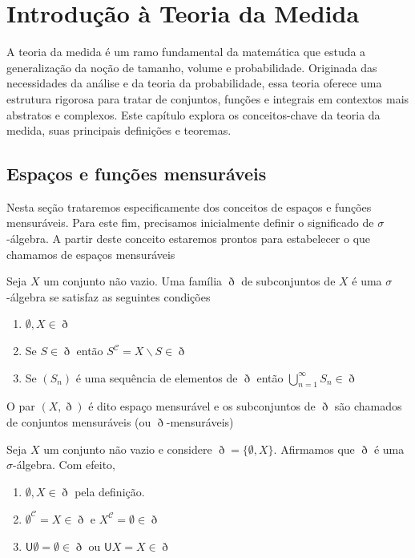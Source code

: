 \documentclass[a4paper, 11pt]{book}
\theoremstyle{definition}
\newcommand{\medcup}{\mathsf{U}}
\begin{document}
\tableofcontents

\chapter{Introdução à Teoria da Medida}

A teoria da medida é um ramo fundamental da matemática que estuda a generalização da noção de tamanho, volume e probabilidade. Originada das necessidades da análise e da teoria da probabilidade, essa teoria oferece uma estrutura rigorosa para tratar de conjuntos, funções e integrais em contextos mais abstratos e complexos. Este capítulo explora os conceitos-chave da teoria da medida, suas principais definições e teoremas.

\section{Espaços e funções mensuráveis}

Nesta seção trataremos especificamente dos conceitos de espaços e funções mensuráveis. Para este fim, precisamos inicialmente definir o significado de $\sigma$-álgebra. A partir deste conceito estaremos prontos para estabelecer o que chamamos de espaços mensuráveis

\begin{dbox}
    Seja $X$ um conjunto não vazio. Uma família $\eth$ de subconjuntos de $X$ é uma $\sigma$-álgebra se satisfaz as seguintes condições
    \begin{enumerate}[leftmargin=*]
        \item $\emptyset, X \in \eth$
        \item Se $S \in \eth$ então $S^{\mathcal{C}} = X \smallsetminus S \in \eth$
        \item Se $(S_n)$ é uma sequência de elementos de $\eth$ então $\bigcup \limits_{n=1}^{\infty} S_n \in \eth$
    \end{enumerate} 
    O par $(X, \eth)$ é dito espaço mensurável e os subconjuntos de $\eth$ são chamados de conjuntos mensuráveis (ou $\eth$-mensuráveis)
\end{dbox}

\begin{ex}
    Seja $X$ um conjunto não vazio e considere $\eth = \{\emptyset, X\}$. 
    Afirmamos que $\eth$ é uma $\sigma$-álgebra.
    Com efeito,
    \begin{enumerate}[leftmargin=*]
        \item $\emptyset, X \in \eth$ pela definição.
        \item $\emptyset^{\mathcal{C}} = X \in \eth$ e $X^{\mathcal{C}} = \emptyset \in \eth$
        \item $\medcup \emptyset = \emptyset \in \eth$ ou $\medcup X = X \in \eth$
    \end{enumerate}
\end{ex}
\end{document}
